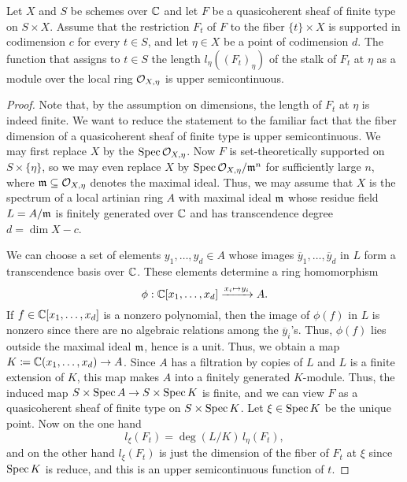 \begin{lem}\label{uppersemi2}
Let $X$ and $S$ be schemes over $\mathbb{C}$ and let $F$ be a quasicoherent sheaf of finite type on $S \times X$. Assume that the restriction $F_t$ of $F$ to the fiber $\{t\} \times X$ is supported in codimension $c$ for every $t \in S$, and let $\eta \in X$ be a point of codimension $d$. The function that assigns to $t \in S$ the length $l_\eta((F_t)_\eta)$ of the stalk of $F_t$ at $\eta$ as a module over the local ring $\mathcal{O}_{X,\eta}$ is upper semicontinuous. 
\end{lem}
\begin{proof}
Note that, by the assumption on dimensions, the length of $F_t$ at $\eta$ is indeed finite. We want to reduce the statement to the familiar fact that the fiber dimension of a quasicoherent sheaf of finite type is upper semicontinuous. We may first replace $X$ by the $\operatorname{\mathrm{Spec}} \mathcal{O}_{X,\eta}$. Now $F$ is set-theoretically supported on $S \times \{\eta\}$, so we may even replace $X$ by $\operatorname{\mathrm{Spec}} \mathcal{O}_{X,\eta}/\mathfrak{m}^n$ for sufficiently large $n$, where $\mathfrak{m} \subseteq \mathcal{O}_{X,\eta}$ denotes the maximal ideal. Thus, we may assume that $X$ is the spectrum of a local artinian ring $A$ with maximal ideal $\mathfrak{m}$ whose residue field $L = A/\mathfrak{m}$ is finitely generated over $\mathbb{C}$ and has transcendence degree $d = \dim X - c$.

We can choose a set of elements $y_1, \ldots, y_d \in A$ whose images $\overline{y}_1,\ldots,\overline{y}_d$ in $L$ form a transcendence basis over $\mathbb{C}$. These elements determine a ring homomorphism
\[ \phi: \mathbb{C}[x_1, \ldots, x_d] \xrightarrow{x_i \mapsto y_i} A. \]
If $f \in \mathbb{C}[x_1,\ldots,x_d]$ is a nonzero polynomial, then the image of $\phi(f)$ in $L$ is nonzero since there are no algebraic relations among the $\overline{y}_i$'s. Thus, $\phi(f)$ lies outside the maximal ideal $\mathfrak{m}$, hence is a unit. Thus, we obtain a map $K \coloneqq \mathbb{C}(x_1,\ldots,x_d) \to A$. Since $A$ has a filtration by copies of $L$ and $L$ is a finite extension of $K$, this map makes $A$ into a finitely generated $K$-module. Thus, the induced map $S \times \operatorname{\mathrm{Spec}} A \to S \times \operatorname{\mathrm{Spec}} K$ is finite, and we can view $F$ as a quasicoherent sheaf of finite type on $S \times \operatorname{\mathrm{Spec}} K$. Let $\xi \in \operatorname{\mathrm{Spec}} K$ be the unique point. Now on the one hand
\[ l_\xi(F_t) = \deg(L/K) \, l_\eta(F_t), \]
and on the other hand $l_\xi(F_t)$ is just the dimension of the fiber of $F_t$ at $\xi$ since $\operatorname{\mathrm{Spec}} K$ is reduce, and this is an upper semicontinuous function of $t$.
\end{proof}

